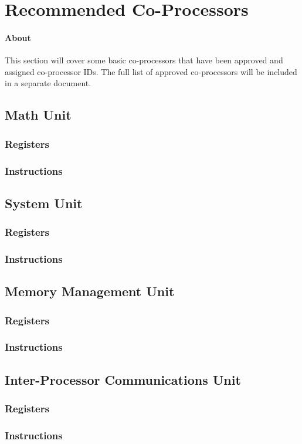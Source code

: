 \documentclass[letterpaper, 11pt]{article}
\begin{document}
\section{Recommended Co-Processors}
\paragraph{About} This section will cover some basic co-processors that have been approved and assigned co-processor IDs. The full list of approved co-processors will be included in a separate document. 
\subsection{Math Unit}
\subsubsection{Registers}
\subsubsection{Instructions}
\subsection{System Unit}
\subsubsection{Registers}
\subsubsection{Instructions}
\subsection{Memory Management Unit}
\subsubsection{Registers}
\subsubsection{Instructions}
\subsection{Inter-Processor Communications Unit}
\subsubsection{Registers}
\subsubsection{Instructions}
\end{document}

